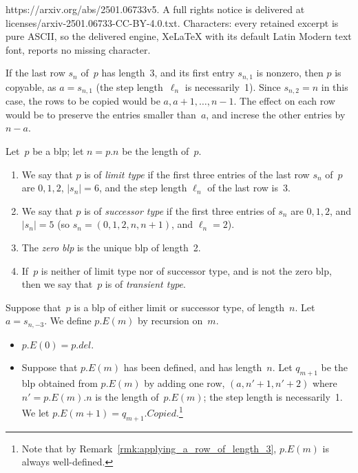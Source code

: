 \documentclass[10pt,a4paper]{amsart}
\begin{document}
https://arxiv.org/abs/2501.06733v5. A full rights notice is delivered at licenses/arxiv-2501.06733-CC-BY-4.0.txt. Characters: every retained excerpt is pure ASCII, so the delivered engine, XeLaTeX with its default Latin Modern text font, reports no missing character.
\begin{remark} \label{rmk:applying_a_row_of_length_3}
  If the last row $s_n$ of~$p$ has length~3, and its first entry $s_{n,1}$ is nonzero, then $p$ is copyable, as $a = s_{n,1}$ (the step length~$\ell_n$ is necessarily~1). Since $s_{n,2} = n$ in this case, the rows to be copied would be $a,a+1,\dots, n-1$. The effect on each row would be to preserve the entries smaller than~$a$, and increse the other entries by $n-a$. 
\end{remark}

\begin{definition} \label{def:limit_and_successor_types} 
Let~$p$ be a blp; let $n = p.n$ be the length of~$p$.
\begin{enumerate}
  \item We say that $p$ is of \emph{limit type} if the first three entries of the last row $s_n$ of~$p$ are $0,1,2$, $|s_n|=6$, and the step length $\ell_n$ of the last row is~3.

  \item We say that $p$ is of \emph{successor type} if the first three entries of $s_n$ are $0,1,2$, and $|s_n|=5$ (so $s_n = (0,1,2,n,n+1)$, and $\ell_n=2$).

  \item The \emph{zero blp} is the unique blp of length~2. 

  \item If~$p$ is neither of limit type nor of successor type, and is not the zero blp, then we say that~$p$ is of \emph{transient type}.
\end{enumerate}
\end{definition}

\begin{definition} \label{def:operation_E}
  Suppose that~$p$ is a blp of either limit or successor type, of length~$n$.  Let $a=s_{n,-3}$. We define $p.E(m)$ by recursion on~$m$. 
  \begin{itemize}
    \item $p.E(0) = p.del$.

    \item Suppose that $p.E(m)$ has been defined, and has length~$n$. Let $q_{m+1}$ be the blp obtained from $p.E(m)$ by adding one row, $(a,n'+1,n'+2)$ where $n' = p.E(m).n$ is the length of~$p.E(m)$; the step length is necessarily~1. We let $p.E(m+1) = q_{m+1}.Copied$.\footnote{Note that by Remark~\ref{rmk:applying_a_row_of_length_3}, $p.E(m)$ is always well-defined.}
  \end{itemize}
\end{definition}
\end{document}
